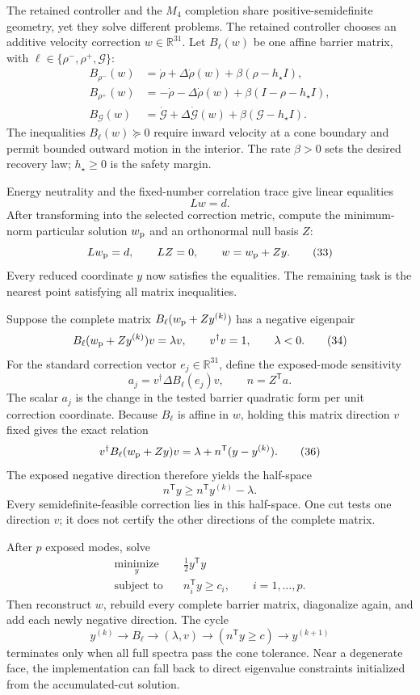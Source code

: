 \documentclass[10pt,letterpaper,twocolumn]{article}
\newcommand{\R}{\mathbb R}
\newcommand{\sectionline}[1]{%
  \Needspace{6\baselineskip}%
  \par\medskip{\color{navy}\large\bfseries #1}\par
  \vspace{-2pt}{\color{navy}\rule{\columnwidth}{0.7pt}}\par\smallskip
}
\begin{document}
\sectionline{7. Cone slicing derives a minimum correction}

The retained controller and the $M_4$ completion share positive-semidefinite
geometry, yet they solve different problems.  The retained controller chooses
an additive velocity correction \(w\in\R^{31}\).  Let
\(B_\ell(w)\) be one affine barrier matrix, with
\(\ell\in\{\rho^-,\rho^+,\mathcal G\}\):
\[
\begin{aligned}
B_{\rho^-}(w)&=\dot\rho+\Delta\dot\rho(w)
+\beta(\rho-h_\star I),\\
B_{\rho^+}(w)&=-\dot\rho-\Delta\dot\rho(w)
+\beta(I-\rho-h_\star I),\\
B_{\mathcal G}(w)&=\dot{\mathcal G}+\Delta\dot{\mathcal G}(w)
+\beta(\mathcal G-h_\star I).
\end{aligned}
\tag{31}
\]
The inequalities \(B_\ell(w)\succeq0\) require inward velocity at a cone
boundary and permit bounded outward motion in the interior.  The rate
\(\beta>0\) sets the desired recovery law; \(h_\star\ge0\) is the safety
margin.

Energy neutrality and the fixed-number correlation trace give linear
equalities
\[
Lw=d.
\tag{32}
\]
After transforming into the selected correction metric, compute the
minimum-norm particular solution \(w_{\rm p}\) and an orthonormal null basis
\(Z\):
\[
Lw_{\rm p}=d,\qquad LZ=0,\qquad
w=w_{\rm p}+Zy.
\tag{33}
\]
Every reduced coordinate \(y\) now satisfies the equalities.  The remaining
task is the nearest point satisfying all matrix inequalities.

Suppose the complete matrix \(B_\ell(w_{\rm p}+Zy^{(k)})\) has a negative
eigenpair
\[
B_\ell(w_{\rm p}+Zy^{(k)})v=\lambda v,\qquad
v^\dagger v=1,\qquad\lambda<0.
\tag{34}
\]
For the standard correction vector \(e_j\in\R^{31}\), define the exposed-mode
sensitivity
\[
a_j=v^\dagger\Delta B_\ell(e_j)v,
\qquad n=Z^{\mathsf T}a.
\tag{35}
\]
The scalar \(a_j\) is the change in the tested barrier quadratic form per unit
correction coordinate.  Because \(B_\ell\) is affine in \(w\), holding this
matrix direction \(v\) fixed gives the exact relation
\[
v^\dagger B_\ell(w_{\rm p}+Zy)v
=\lambda+n^{\mathsf T}(y-y^{(k)}).
\tag{36}
\]
The exposed negative direction therefore yields the half-space
\[
n^{\mathsf T}y\ge n^{\mathsf T}y^{(k)}-\lambda.
\tag{37}
\]
Every semidefinite-feasible correction lies in this half-space.  One cut tests
one direction \(v\); it does not certify the other directions of the complete
matrix.

After \(p\) exposed modes, solve
\[
\begin{aligned}
\underset{y}{\operatorname{minimize}}\quad&\frac12y^{\mathsf T}y\\
\text{subject to}\quad&n_i^{\mathsf T}y\ge c_i,
\qquad i=1,\ldots,p.
\end{aligned}
\tag{38}
\]
Then reconstruct \(w\), rebuild every complete barrier matrix, diagonalize
again, and add each newly negative direction.  The cycle
\[
y^{(k)}\longrightarrow B_\ell
\longrightarrow(\lambda,v)
\longrightarrow(n^{\mathsf T}y\ge c)
\longrightarrow y^{(k+1)}
\tag{39}
\]
terminates only when all full spectra pass the cone tolerance.  Near a
degenerate face, the implementation can fall back to direct eigenvalue
constraints initialized from the accumulated-cut solution.
\end{document}
